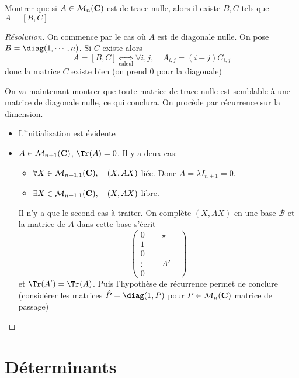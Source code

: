 \begin{exo}
    Montrer que si $A \in  \mathcal  M_n(\mathbf C)$ est de trace nulle, alors  il existe $B, C$ tels que  $A=[B, C]$
\end{exo}
\begin{proof}[Résolution]
    On commence par le cas où $A$ est de diagonale nulle. On pose  $B=\diag(1, \cdots , n)$. Si $C$ existe alors  \[
        A=[B, C] \underset{\text{calcul}}\iff \forall  i, j, \quad  A_{i,j}=(i-j)C_{i,j}
    \] 
    donc la matrice $C$ existe bien (on prend $0$ pour la diagonale)

 
    On va maintenant montrer que toute matrice de trace nulle est semblable à une matrice de diagonale nulle, ce qui conclura. On procède par récurrence sur la dimension. \begin{itemize}
        \item L'initialisation est évidente
        \item $A \in \mathcal  M_{n+1}(\mathbf C)$, $\Tr(A)=0$. Il y a deux cas:  \begin{itemize}
            \item $ \forall  X \in  \mathcal  M_{n+1,1}(\mathbf C), \quad  (X, AX)$ liée. Donc $A=\lambda I_{n+1}=0$.
            \item $ \exists  X \in  \mathcal  M_{n+1,1}(\mathbf C), \quad  (X, AX)$ libre.
        \end{itemize}
        Il n'y a que le second cas à traiter. On complète $(X, AX)$ en une base  $\mathcal  B$ et la matrice de $A$ dans cette base s'écrit  \[
            \left( \begin{array}{c|ccc}
                    0 & & \star& \\
                    \hline 1\\
                    0 & &  \\
                    \vdots&\phantom{0}&A' \\
                    0
            \end{array}
             \right) 
        \] 
        et $\Tr(A')=\Tr(A)$. Puis l'hypothèse de récurrence permet de conclure (considérer les matrices $\hat{P}=\diag(1, P)$ pour $P \in  \mathcal  M_n(\mathbf C)$ matrice de passage)
    \end{itemize}
\end{proof}

\section{Déterminants}

